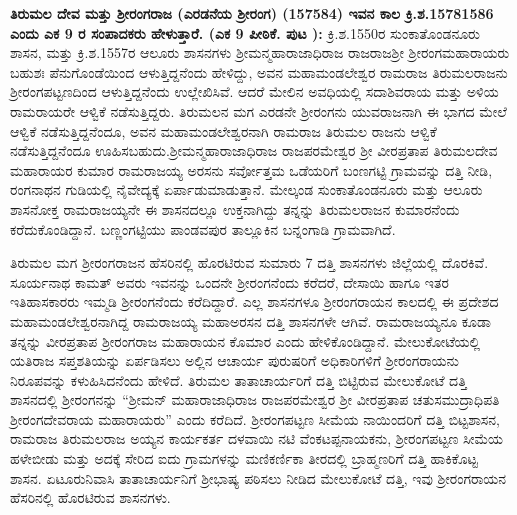 \textbf{ತಿರುಮಲ ದೇವ ಮತ್ತು ಶ‍್ರೀರಂಗರಾಜ (ಎರಡನೆಯ ಶ‍್ರೀರಂಗ) (157584) ಇವನ ಕಾಲ ಕ್ರಿ.ಶ.15781586 ಎಂದು ಎಕ 9 ರ ಸಂಪಾದಕರು ಹೇಳುತ್ತಾರೆ. (ಎಕ 9 ಪೀಠಿಕೆ. ಪುಟ ): } ಕ್ರಿ.ಶ.1550ರ ಸುಂಕಾತೊಂಡನೂರು ಶಾಸನ, ಮತ್ತು ಕ್ರಿ.ಶ.1557ರ ಆಲೂರು ಶಾಸನಗಳು ಶ‍್ರೀಮನ್ಮಹಾರಾಜಾಧಿರಾಜ ರಾಜರಾಜಶ‍್ರೀ ಶ‍್ರೀರಂಗಮಹಾರಾಯರು ಬಹುಶಃ ಪೆನುಗೊಂಡೆಯಿಂದ ಆಳುತ್ತಿದ್ದನೆಂದು ಹೇಳಿದ್ದು, ಅವನ ಮಹಾಮಂಡಲೇಶ್ವರ ರಾಮರಾಜ ತಿರುಮಲರಾಜನು ಶ‍್ರೀರಂಗಪಟ್ಟಣದಿಂದ ಆಳುತ್ತಿದ್ದನೆಂದು ಉಲ್ಲೇಖಿಸಿವೆ. ಆದರೆ ಮೇಲಿನ ಅವಧಿಯಲ್ಲಿ ಸದಾಶಿವರಾಯ ಮತ್ತು ಅಳಿಯ ರಾಮರಾಯರೇ ಆಳ್ವಿಕೆ ನಡೆಸುತ್ತಿದ್ದರು. ತಿರುಮಲನ ಮಗ ಎರಡನೇ ಶ‍್ರೀರಂಗನು ಯುವರಾಜನಾಗಿ ಈ ಭಾಗದ ಮೇಲೆ ಆಳ್ವಿಕೆ ನಡೆಸುತ್ತಿದ್ದನೆಂದೂ, ಅವನ ಮಹಾಮಂಡಲೇಶ್ವರನಾಗಿ ರಾಮರಾಜ ತಿರುಮಲ ರಾಜನು ಆಳ್ವಿಕೆ ನಡೆಸುತ್ತಿದ್ದನೆಂದೂ ಊಹಿಸಬಹುದು.\break ಶ‍್ರೀಮನ್ಮಹಾರಾಜಾಧಿರಾಜ ರಾಜಪರಮೇಶ್ವರ ಶ‍್ರೀ ವೀರಪ್ರತಾಪ ತಿರುಮಲದೇವ ಮಹಾರಾಯರ ಕುಮಾರ ರಾಮರಾಜಯ್ಯ ಅರಸನು ಸರ್ವೋತ್ತಮ ಒಡೆಯರಿಗೆ ಬಂಣಗಟ್ಟಿ ಗ್ರಾಮವನ್ನು ದತ್ತಿ ನೀಡಿ, ರಂಗನಾಥನ ಗುಡಿಯಲ್ಲಿ ನೈವೇದ್ಯಕ್ಕೆ ಏರ್ಪಾಡು\-ಮಾಡುತ್ತಾನೆ. ಮೇಲ್ಕಂಡ ಸುಂಕಾತೊಂಡನೂರು ಮತ್ತು ಆಲೂರು ಶಾಸನೋಕ್ತ ರಾಮರಾಜಯ್ಯನೇ ಈ ಶಾಸನದಲ್ಲೂ ಉಕ್ತನಾಗಿದ್ದು ತನ್ನನ್ನು ತಿರುಮಲರಾಜನ ಕುಮಾರನೆಂದು ಕರೆದುಕೊಂಡಿದ್ದಾನೆ. ಬಣ್ಣಂಗಟ್ಟಿಯು ಪಾಂಡವಪುರ ತಾಲ್ಲೂಕಿನ ಬನ್ನಂಗಾಡಿ ಗ್ರಾಮವಾಗಿದೆ. 

ತಿರುಮಲ ಮಗ ಶ‍್ರೀರಂಗರಾಜನ ಹೆಸರಿನಲ್ಲಿ ಹೊರಟಿರುವ ಸುಮಾರು 7 ದತ್ತಿ ಶಾಸನಗಳು ಜಿಲ್ಲೆಯಲ್ಲಿ ದೊರಕಿವೆ. ಸೂರ್ಯನಾಥ ಕಾಮತ್​ ಅವರು ಇವನನ್ನು ಒಂದನೇ ಶ‍್ರೀರಂಗನೆಂದು ಕರೆದರೆ, ದೇಸಾಯಿ ಹಾಗೂ ಇತರ ಇತಿಹಾಸಕಾರರು ಇಮ್ಮಡಿ ಶ‍್ರೀರಂಗನೆಂದು ಕರೆದಿದ್ದಾರೆ. ಎಲ್ಲ ಶಾಸನಗಳೂ ಶ‍್ರೀರಂಗರಾಯನ ಕಾಲದಲ್ಲಿ ಈ ಪ್ರದೇಶದ ಮಹಾಮಂಡಲೇಶ್ವರ\-ನಾಗಿದ್ದ ರಾಮರಾಜಯ್ಯ ಮಹಾಅರಸನ ದತ್ತಿ ಶಾಸನಗಳೇ ಆಗಿವೆ. ರಾಮರಾಜಯ್ಯನೂ ಕೂಡಾ ತನ್ನನ್ನು ವೀರಪ್ರತಾಪ ಶ‍್ರೀರಂಗರಾಜ ಮಹಾರಾಯನ ಕೊಮಾರ ಎಂದು ಹೇಳಿಕೊಂಡಿದ್ದಾನೆ. ಮೇಲುಕೋಟೆಯಲ್ಲಿ ಯತಿರಾಜ ಸಪ್ತಶತಿಯನ್ನು ಏರ್ಪಡಿಸಲು ಅಲ್ಲಿನ ಆಚಾರ್ಯ ಪುರುಷರಿಗೆ ಅಧಿಕಾರಿಗಳಿಗೆ ಶ‍್ರೀರಂಗರಾಯನು ನಿರೂಪವನ್ನು ಕಳುಹಿಸಿದನೆಂದು ಹೇಳಿದೆ. ತಿರುಮಲ ತಾತಾಚಾರ್ಯರಿಗೆ ದತ್ತಿ ಬಿಟ್ಟಿರುವ ಮೇಲುಕೋಟೆ ದತ್ತಿ ಶಾಸನದಲ್ಲಿ ಶ‍್ರೀರಂಗನನ್ನು “ಶ‍್ರೀಮನ್​ ಮಹಾರಾಜಾಧಿರಾಜ ರಾಜಪರಮೇಶ್ವರ ಶ‍್ರೀ ವೀರಪ್ರತಾಪ ಚತುಸಮುದ್ರಾಧಿಪತಿ ಶ‍್ರೀರಂಗದೇವರಾಯ ಮಹಾರಾಯರು” ಎಂದು ಕರೆದಿದೆ. ಶ‍್ರೀರಂಗಪಟ್ಟಣ ಸೀಮೆಯ ನಾಯಿಂದರಿಗೆ ದತ್ತಿ ಬಿಟ್ಟಶಾಸನ, ರಾಮರಾಜ ತಿರುಮಲರಾಜ ಅಯ್ಯನ ಕಾರ್ಯಕರ್ತ ದಳವಾಯಿ ನಟಿ ವೆಂಕಟಪ್ಪನಾಯಕನು, ಶ‍್ರೀರಂಗಪಟ್ಟಣ ಸೀಮೆಯ ಹಳೇಬೀಡು ಮತ್ತು ಅದಕ್ಕೆ ಸೇರಿದ ಐದು ಗ್ರಾಮಗಳನ್ನು ಮಣಿಕರ್ಣಿಕಾ ತೀರದಲ್ಲಿ ಬ್ರಾಹ್ಮಣರಿಗೆ ದತ್ತಿ ಹಾಕಿಕೊಟ್ಟ ಶಾಸನ. ಏಟೂರುನಿವಾಸಿ ತಾತಾಚಾರ್ಯನಿಗೆ ಶ‍್ರೀಭಾಷ್ಯ ಪಠಿಸಲು ನೀಡಿದ ಮೇಲುಕೋಟೆ ದತ್ತಿ, ಇವು ಶ‍್ರೀರಂಗರಾಯನ ಹೆಸರಿನಲ್ಲಿ ಹೊರಟಿರುವ ಶಾಸನಗಳು.

